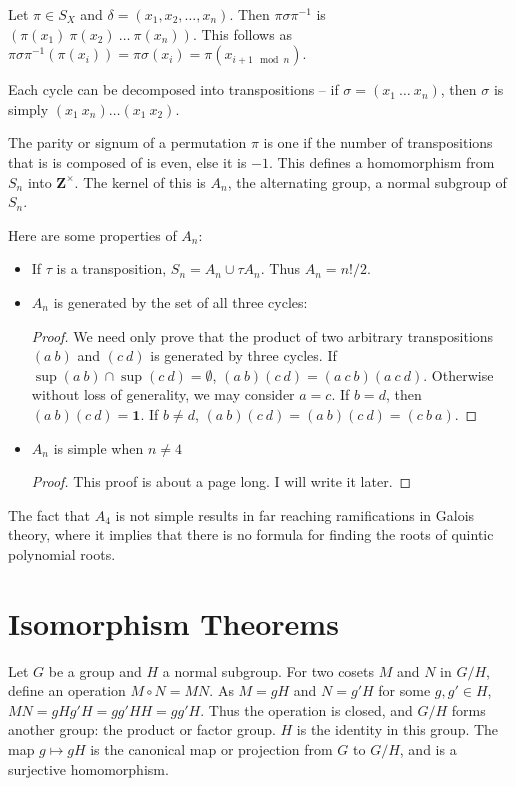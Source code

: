 \documentclass{report}
\begin{document}
Let $\pi \in S_X$ and $\delta = (x_1, x_2, \dots, x_n)$. Then $\pi \sigma \pi^{-1}$ is $(\pi(x_1)\ \pi(x_2)\ \dots\ \pi(x_n))$. This follows as $\pi \sigma \pi^{-1} (\pi(x_i)) = \pi \sigma(x_i) = \pi(x_{i+1 \mod n})$.

Each cycle can be decomposed into transpositions -- if $\sigma = (x_1\ \dots\ x_n)$, then $\sigma$ is simply $(x_1\ x_n) \dots (x_1\ x_2)$.

The parity or signum of a permutation $\pi$ is one if the number of transpositions that is is composed of is even, else it is $-1$. This defines a homomorphism from $S_n$ into $\mathbf{Z}^\times$. The kernel of this is $A_n$, the alternating group, a normal subgroup of $S_n$.

Here are some properties of $A_n$:
\begin{itemize}
    \item If $\tau$ is a transposition, $S_n = A_n \cup \tau A_n$. Thus $A_n = n!/2$.
    \item $A_n$ is generated by the set of all three cycles:
    \begin{proof}
        We need only prove that the product of two arbitrary transpositions $(a\ b)$ and $(c\ d)$ is generated by three cycles. If $\sup(a\ b) \cap \sup(c\ d) = \emptyset$, $(a\ b)(c\ d) = (a\ c\ b)(a\ c\ d)$. Otherwise without loss of generality, we may consider $a = c$. If $b = d$, then $(a\ b)(c\ d) = \mathbf{1}$. If $b \neq d$, $(a\ b)(c\ d) = (a\ b)(c\ d) = (c\ b\ a)$.
    \end{proof}
    \item $A_n$ is simple when $n \neq 4$
    \begin{proof}
        This proof is about a page long. I will write it later.
    \end{proof}
\end{itemize}

The fact that $A_4$ is not simple results in far reaching ramifications in Galois theory, where it implies that there is no formula for finding the roots of quintic polynomial roots.

\chapter{Isomorphism Theorems}

Let $G$ be a group and $H$ a normal subgroup. For two cosets $M$ and $N$ in $G/H$, define an operation $M \circ N = MN$. As $M = gH$ and $N = g'H$ for some $g,g' \in H$, $MN = gHg'H = gg'HH = gg'H$. Thus the operation is closed, and $G/H$ forms another group: the product or factor group. $H$ is the identity in this group. The map $g \mapsto gH$ is the canonical map or projection from $G$ to $G/H$, and is a surjective homomorphism.
\end{document}

